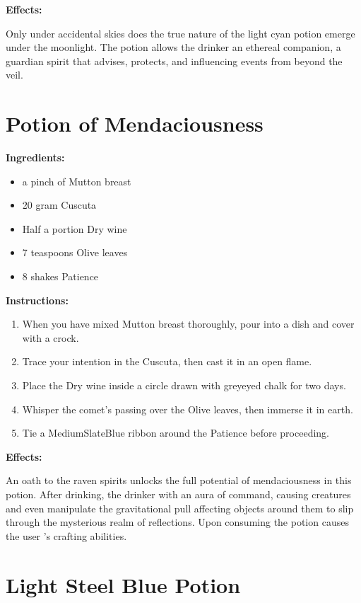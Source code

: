 \documentclass{article}
\begin{document}
\textbf{Effects:}

Only under accidental skies does the true nature of the light cyan potion emerge under the moonlight. The potion allows the drinker an ethereal companion, a guardian spirit that advises, protects, and influencing events from beyond the veil.

\newpage
\section*{Potion of Mendaciousness}

\textbf{Ingredients:}

\begin{itemize}
  \item a pinch of Mutton breast
  \item 20 gram Cuscuta
  \item Half a portion Dry wine
  \item 7 teaspoons Olive leaves
  \item 8 shakes Patience
\end{itemize}

\textbf{Instructions:}

\begin{enumerate}
  \item When you have mixed Mutton breast thoroughly, pour into a dish and cover with a crock.
  \item Trace your intention in the Cuscuta, then cast it in an open flame.
  \item Place the Dry wine inside a circle drawn with greyeyed chalk for two days.
  \item Whisper the comet’s passing over the Olive leaves, then immerse it in earth.
  \item Tie a MediumSlateBlue ribbon around the Patience before proceeding.
\end{enumerate}

\textbf{Effects:}

An oath to the raven spirits unlocks the full potential of mendaciousness in this potion. After drinking, the drinker with an aura of command, causing creatures and even manipulate the gravitational pull affecting objects around them to slip through the mysterious realm of reflections. Upon consuming the potion causes the user 's crafting abilities.

\newpage
\section*{Light Steel Blue Potion}
\end{document}
